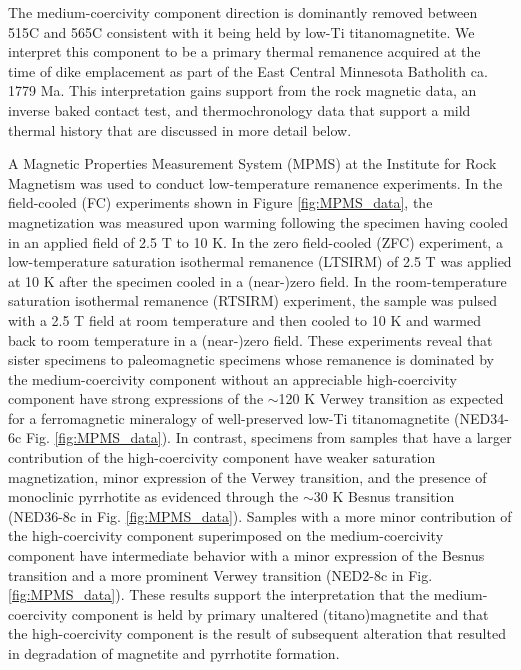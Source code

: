\documentclass[draft]{agujournal2019}
\begin{document}
The medium-coercivity component direction is dominantly removed between 515\textdegree C and 565\textdegree C consistent with it being held by low-Ti titanomagnetite. We interpret this component to be a primary thermal remanence acquired at the time of dike emplacement as part of the East Central Minnesota Batholith ca. 1779 Ma. This interpretation gains support from the rock magnetic data, an inverse baked contact test, and thermochronology data that support a mild thermal history that are discussed in more detail below. 

A Magnetic Properties Measurement System (MPMS) at the Institute for Rock Magnetism was used to conduct low-temperature remanence experiments. In the field-cooled (FC) experiments shown in Figure \ref{fig:MPMS_data}, the magnetization was measured upon warming following the specimen having cooled in an applied field of 2.5 T to 10 K. In the zero field-cooled (ZFC) experiment, a low-temperature saturation isothermal remanence (LTSIRM) of 2.5 T was applied at 10 K after the specimen cooled in a (near-)zero field. In the room-temperature saturation isothermal remanence (RTSIRM) experiment, the sample was pulsed with a 2.5 T field at room temperature and then cooled to 10 K and warmed back to room temperature in a (near-)zero field. These experiments reveal that sister specimens to paleomagnetic specimens whose remanence is dominated by the medium-coercivity component without an appreciable high-coercivity component have strong expressions of the $\sim$120 K Verwey transition as expected for a ferromagnetic mineralogy of well-preserved low-Ti titanomagnetite (NED34-6c Fig. \ref{fig:MPMS_data}). In contrast, specimens from samples that have a larger contribution of the high-coercivity component have weaker saturation magnetization, minor expression of the Verwey transition, and the presence of monoclinic pyrrhotite as evidenced through the $\sim$30 K Besnus transition (NED36-8c in Fig. \ref{fig:MPMS_data}). Samples with a more minor contribution of the high-coercivity component superimposed on the medium-coercivity component have intermediate behavior with a minor expression of the Besnus transition and a more prominent Verwey transition (NED2-8c in Fig. \ref{fig:MPMS_data}). These results support the interpretation that the medium-coercivity component is held by primary unaltered (titano)magnetite and that the high-coercivity component is the result of subsequent alteration that resulted in degradation of magnetite and pyrrhotite formation.
\end{document}
